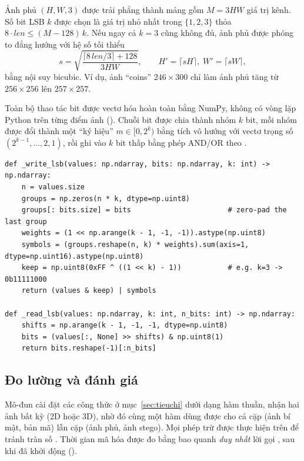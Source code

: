 Ảnh phủ $(H, W, 3)$ được trải phẳng thành mảng  gồm $M = 3HW$ giá trị kênh. Số bit LSB
$k$ được chọn là giá trị nhỏ nhất trong $\{1, 2, 3\}$ thỏa $8\cdot\mathit{len} \le (M - 128)\,k$.
Nếu ngay cả $k = 3$ cũng không đủ, ảnh phủ được phóng to đẳng hướng với hệ số tối thiểu
\begin{equation}
  s = \sqrt{\frac{\lceil 8\,\mathit{len}/3 \rceil + 128}{3HW}}, \qquad
  H' = \lceil sH \rceil,\; W' = \lceil sW \rceil,
  \label{eq:scaleup}
\end{equation}
bằng nội suy bicubic. Ví dụ, ảnh ``coins'' $246\times300$ chỉ làm ảnh phủ tăng từ $256\times256$
lên $257\times257$.

Toàn bộ thao tác bit được vectơ hóa hoàn toàn bằng NumPy, không có vòng lặp Python trên từng điểm
ảnh (). Chuỗi bit được chia thành nhóm $k$ bit, mỗi nhóm được đổi thành một ``ký
hiệu'' $m \in [0, 2^k)$ bằng tích vô hướng với vectơ trọng số $(2^{k-1}, \dots, 2, 1)$, rồi ghi vào
$k$ bit thấp bằng phép AND/OR theo .

\begin{lstlisting}[caption={Ghi và đọc $k$ bit thấp theo kiểu vectơ hóa (\code{stego/lsb.py})}, label={lst:lsb}]
def _write_lsb(values: np.ndarray, bits: np.ndarray, k: int) -> np.ndarray:
    n = values.size
    groups = np.zeros(n * k, dtype=np.uint8)
    groups[: bits.size] = bits                       # zero-pad the last group
    weights = (1 << np.arange(k - 1, -1, -1)).astype(np.uint8)
    symbols = (groups.reshape(n, k) * weights).sum(axis=1, dtype=np.uint16).astype(np.uint8)
    keep = np.uint8(0xFF ^ ((1 << k) - 1))           # e.g. k=3 -> 0b11111000
    return (values & keep) | symbols

def _read_lsb(values: np.ndarray, k: int, n_bits: int) -> np.ndarray:
    shifts = np.arange(k - 1, -1, -1, dtype=np.uint8)
    bits = (values[:, None] >> shifts) & np.uint8(1)
    return bits.reshape(-1)[:n_bits]
\end{lstlisting}

\subsection{Đo lường và đánh giá}

Mô-đun  cài đặt các công thức ở mục~\ref{sec:tieuchi} dưới dạng hàm thuần, nhận hai
ảnh  bất kỳ (2D hoặc 3D), nhờ đó cùng một hàm dùng được cho cả cặp (ảnh bí mật, bản mã)
lẫn cặp (ảnh phủ, ảnh stego). Mọi phép trừ được thực hiện trên  để tránh tràn số
. Thời gian mã hóa được đo bằng  bao quanh \emph{duy nhất}
lời gọi , sau khi đã khởi động ().

